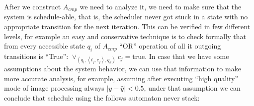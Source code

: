 \documentclass[ twoside, 12pt ]{article}
\begin{document}
{%
After we construct $A_{cmp}$ we need to analyze it, we need to make sure that the system is schedule-able, that is, the scheduler never got stuck in a state with no appropriate transition for the next iteration.
This can be verified in few different levels, for example an easy and conservative technique is to check formally that from every accessible state $q_i$ of $A_{cmp}$ ``OR'' operation of all it outgoing transitions is ``True'': $\vee_{(q_i, \left < t_j, c_j \right > , q_k)}  c_j = \text{true} $. 
In case that we have some assumptions about the system behavior, we can use that information to make more accurate analysis, for example, assuming after executing ``high quality'' mode of image processing always $|y-\hat{y}| < 0.5$, under that assumption we can conclude that schedule using the follows automaton never stack:
\begin{center}
\end{center}
} 
\end{document}
